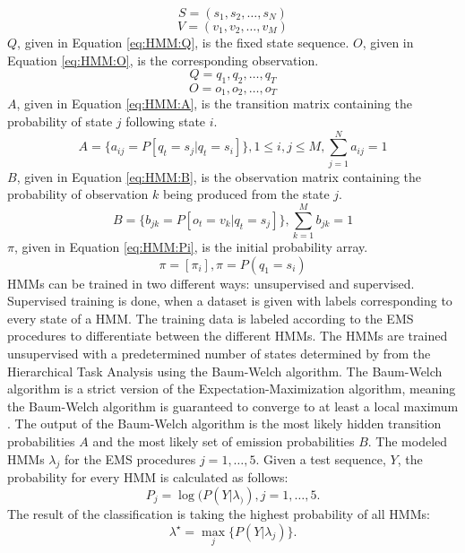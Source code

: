\begin{equation}\label{eq:HMM:S}
S=(s_1,s_2,\dots,s_N)
\end{equation}
\begin{equation}\label{eq:HMM:V}
V=(v_1,v_2,\dots,v_M)
\end{equation}
$Q$, given in Equation \ref{eq:HMM:Q}, is the fixed state sequence. $O$, given in Equation \ref{eq:HMM:O}, is the corresponding observation.
\begin{equation}\label{eq:HMM:Q}
Q=q_1,q_2,\dots,q_T
\end{equation}
\begin{equation}\label{eq:HMM:O}
O=o_1,o_2,\dots,o_T
\end{equation}
$A$, given in Equation \ref{eq:HMM:A}, is the transition matrix containing the probability of state $j$ following state $i$.
\begin{equation}\label{eq:HMM:A}
A = \{a_{ij} = P[q_t=s_j|q_t=s_i]\}, 1\leq i, j\leq M, \sum_{j=1}^{N}a_{ij}=1
\end{equation}
$B$, given in Equation \ref{eq:HMM:B}, is the observation matrix containing the probability of observation $k$ being produced from the state $j$.
\begin{equation}\label{eq:HMM:B}
B= \{b_{jk}=P[o_t=v_k|q_t=s_j]\}, \sum_{k=1}^{M}b_{jk}=1
\end{equation}
$\pi$, given in Equation \ref{eq:HMM:Pi}, is the initial probability array.
\begin{equation}\label{eq:HMM:Pi}
\pi=[\pi_i],\pi=P(q_1=s_i)
\end{equation}
HMMs can be trained in two different ways: unsupervised and supervised. Supervised training is done, when a dataset is given with labels corresponding to every state of a HMM. The training data is labeled according to the EMS procedures to differentiate between the different HMMs. The HMMs are trained unsupervised with a predetermined number of states determined by from the Hierarchical Task Analysis using the Baum-Welch algorithm. The Baum-Welch algorithm is a strict version of the Expectation-Maximization algorithm, meaning the Baum-Welch algorithm is guaranteed to converge to at least a local maximum \cite{baum1970}. The output of the Baum-Welch algorithm is the most likely hidden transition probabilities $A$ and the most likely set of emission probabilities $B$. The modeled HMMs $\lambda_{j}$ for the EMS procedures $j=1,\dots,5$. Given a test sequence, $Y$, the probability for every HMM is calculated as follows:
$$P_j=\log(P(Y|\lambda_)), j=1,\dots,5.$$
The result of the classification is taking the highest probability of all HMMs:
$$\lambda^\star=\max_{j}\{P(Y|\lambda_{j})\}.$$

